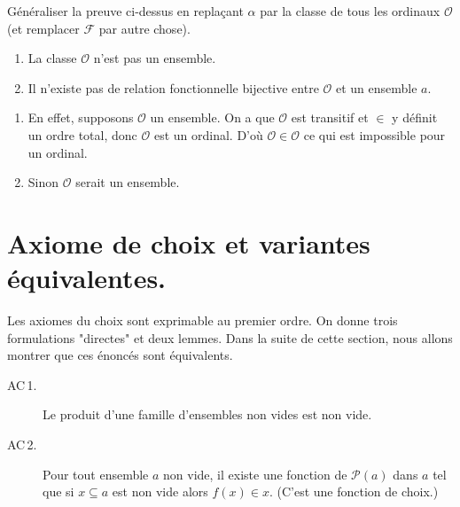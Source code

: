 \documentclass[./main]{subfiles}
\begin{document}
  \begin{exo}
    Généraliser la preuve ci-dessus en replaçant $\alpha$ par la classe de tous les ordinaux $\mathcal{O}$ (et remplacer $\mathcal{F}$ par autre chose).
  \end{exo}

  \begin{prop}
    \begin{enumerate}
      \item La classe $\mathcal{O}$ n'est pas un ensemble.
      \item Il n'existe pas de relation fonctionnelle bijective entre $\mathcal{O}$ et un ensemble $a$.
    \end{enumerate}
  \end{prop}
  \begin{prv}
    \begin{enumerate}
      \item En effet, supposons $\mathcal{O}$ un ensemble. On a que $\mathcal{O}$ est transitif et $\in$ y définit un ordre total, donc $\mathcal{O}$ est un ordinal. D'où $\mathcal{O} \in \mathcal{O}$ ce qui est impossible pour un ordinal.
      \item Sinon $\mathcal{O}$ serait un ensemble.
    \end{enumerate}
  \end{prv}

  \section{Axiome de choix et variantes équivalentes.}

  Les axiomes du choix sont exprimable au premier ordre. On donne trois formulations "directes" et deux lemmes.
  Dans la suite de cette section, nous allons montrer que ces énoncés sont équivalents.

  \begin{description}
    \item[AC\,1.\label{AC1}]
      Le produit d'une famille d'ensembles non vides est non vide.
  \end{description}

  \begin{description}
    \item[AC\,2.\label{AC2}]
      Pour tout ensemble $a$ non vide, il existe une fonction de $\mathcal{P}(a)$ dans $a$ tel que si $x \subseteq a$ est non vide alors $f(x) \in x$.
      (C'est une fonction de choix.)
  \end{description}
\end{document}
